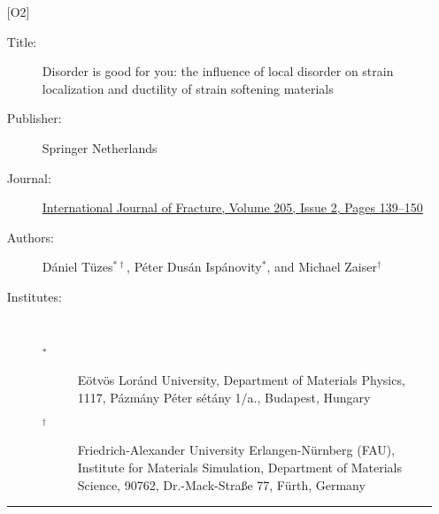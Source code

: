 \begin{itemize}
\item [{[O2]}] \label{paper:A3}
\begin{description}
\item [Title:] Disorder is good for you: the influence of local disorder on strain localization and ductility of strain softening materials
\item [Publisher:] Springer Netherlands
\item [Journal:] \href{https://doi.org/10.1007/s10704-017-0187-1}{International Journal of Fracture, Volume 205, Issue 2, Pages 139–150}
\item [Authors:] Dániel Tüzes$^{* \dagger}$, Péter Dusán Ispánovity$^*$, and Michael Zaiser$^\dagger$
\item [Institutes:]~
\begin{description}
\item [$^*$] Eötvös Loránd University, Department of Materials Physics, 1117, Pázmány Péter sétány 1/a., Budapest, Hungary
\item [$^\dagger$] Friedrich-Alexander University Erlangen-Nürnberg (FAU), Institute for Materials Simulation, Department of Materials Science, 90762, Dr.-Mack-Straße 77, Fürth, Germany
\end{description}
\end{description}
\noindent\rule{8cm}{0.4pt}



\end{itemize}

